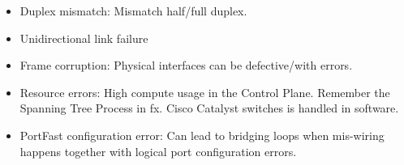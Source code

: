 \begin{itemize}
    \item Duplex mismatch: Mismatch half/full duplex.
    \item Unidirectional link failure
    \item Frame corruption: Physical interfaces can be defective/with errors.
    \item Resource errors: High compute usage in the Control Plane. {\scriptsize Remember the Spanning Tree Process in fx. Cisco Catalyst switches is handled in software.}
    \item PortFast configuration error: Can lead to bridging loops when mis-wiring happens together with logical port configuration errors.
\end{itemize}
